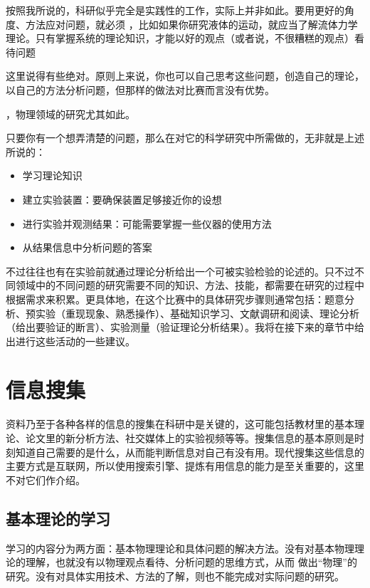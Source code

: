 \documentclass[a4paper,10pt,english]{sphinxmanual}
\begin{document}
按照我所说的，科研似乎完全是实践性的工作，实际上并非如此。要用更好的角度、方法应对问题，就必须  ，比如如果你研究液体的运动，就应当了解流体力学理论。只有掌握系统的理论知识，才能以好的观点（或者说，不很糟糕的观点）看待问题 %
\begin{footnote}[1]\sphinxAtStartFootnote
这里说得有些绝对。原则上来说，你也可以自己思考这些问题，创造自己的理论，以自己的方法分析问题，但那样的做法对比赛而言没有优势。
%
\end{footnote} ，物理领域的研究尤其如此。

只要你有一个想弄清楚的问题，那么在对它的科学研究中所需做的，无非就是上述所说的：
\begin{itemize}
\item {} 
学习理论知识

\item {} 
建立实验装置：要确保装置足够接近你的设想

\item {} 
进行实验并观测结果：可能需要掌握一些仪器的使用方法

\item {} 
从结果信息中分析问题的答案

\end{itemize}

不过往往也有在实验前就通过理论分析给出一个可被实验检验的论述的。只不过不同领域中的不同问题的研究需要不同的知识、方法、技能，都需要在研究的过程中根据需求来积累。更具体地，在这个比赛中的具体研究步骤则通常包括：题意分析、预实验（重现现象、熟悉操作）、基础知识学习、文献调研和阅读、理论分析（给出要验证的断言）、实验测量（验证理论分析结果）。我将在接下来的章节中给出进行这些活动的一些建议。


\chapter{信息搜集}
\label{\detokenize{4. GetInfo::doc}}\label{\detokenize{4. GetInfo:id1}}
资料乃至于各种各样的信息的搜集在科研中是关键的，这可能包括教材里的基本理论、论文里的新分析方法、社交媒体上的实验视频等等。搜集信息的基本原则是时刻知道自己需要的是什么，从而能判断信息对自己有没有用。现代搜集这些信息的主要方式是互联网，所以使用搜索引擎、提炼有用信息的能力是至关重要的，这里不对它们作介绍。


\section{基本理论的学习}
\label{\detokenize{4. GetInfo:id2}}
学习的内容分为两方面：基本物理理论和具体问题的解决方法。没有对基本物理理论的理解，也就没有以物理观点看待、分析问题的思维方式，从而  做出“物理”的研究。没有对具体实用技术、方法的了解，则也不能完成对实际问题的研究。
\end{document}
